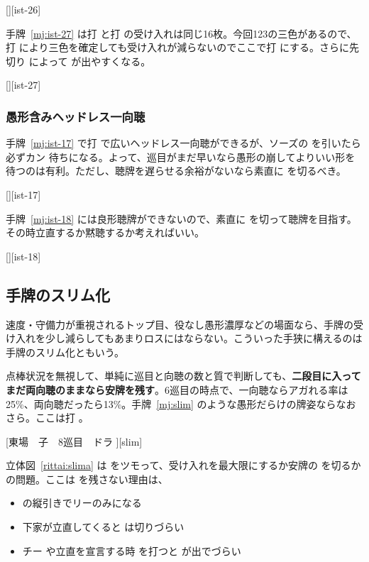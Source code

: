 \documentclass[../nankiru_main.tex]{subfiles}
\begin{document}
[][ist-26]

手牌~\ref{mj:ist-27} は打  と打  の受け入れは同じ16枚。今回123の三色があるので、打  により三色を確定しても受け入れが減らないのでここで打  にする。さらに先切り  によって  が出やすくなる\citep[][p. 12]{uzaku-nankiru}。

[][ist-27]


\subsubsection*{愚形含みヘッドレス一向聴} 

手牌~\ref{mj:ist-17} で打  で広いヘッドレス一向聴ができるが、ソーズの  を引いたら必ずカン  待ちになる。よって、巡目がまだ早いなら愚形の崩してよりいい形を待つのは有利。ただし、聴牌を遅らせる余裕がないなら素直に  を切るべき。

[][ist-17]

手牌~\ref{mj:ist-18} には良形聴牌ができないので、素直に  を切って聴牌を目指す。その時立直するか黙聴するか考えればいい。

[][ist-18]

\subsection{手牌のスリム化}

速度・守備力が重視されるトップ目、役なし愚形濃厚などの場面なら、手牌の受け入れを少し減らしてもあまりロスにはならない。こういった手狭に構えるのは手牌のスリム化ともいう\citep[][p. 29]{suphx}。

点棒状況を無視して、単純に巡目と向聴の数と質で判断しても、\textbf{二段目に入ってまだ両向聴のままなら安牌を残す}\citep[][pp.~106-107]{fkt}。6巡目の時点で、一向聴ならアガれる率は25\%、両向聴だったら13\%。手牌~\ref{mj:slim} のような愚形だらけの牌姿ならなおさら。ここは打 。

[東場　子　8巡目　ドラ ][slim]

立体図~\ref{rittai:slima} は  をツモって、受け入れを最大限にするか安牌の  を切るかの問題。ここは  を残さない理由は、

\begin{itemize}
\item {} の縦引きでリーのみになる
\item 下家が立直してくると  は切りづらい
\item チー  や立直を宣言する時  を打つと  が出でづらい
\end{itemize}
\end{document}
